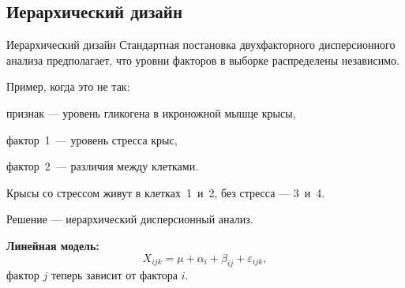 \documentclass[9pt,pdf,utf8,hyperref={unicode},aspectratio=169]{beamer}
\begin{document}
\subsection{Иерархический дизайн}
\begin{frame}{Иерархический дизайн}
    Стандартная постановка двухфакторного дисперсионного анализа предполагает, что уровни факторов в выборке распределены независимо.

    \bigskip

    Пример, когда это не так: 
    
    признак --- уровень гликогена в икроножной мышце крысы, 
    
    фактор~1~--- уровень стресса крыс,
    
    фактор~2~--- различия между клетками. 
    
    Крысы со стрессом живут в клетках~1~и~2, без стресса --- 3~и~4.

    \bigskip

    Решение --- иерархический дисперсионный анализ.
    
    \textbf{Линейная модель:}
    $$X_{ijk} = \mu + \alpha_i + \beta_{ij} + \varepsilon_{ijk}, $$
    фактор $j$ теперь зависит от фактора $i$.

\end{frame}
\end{document}
